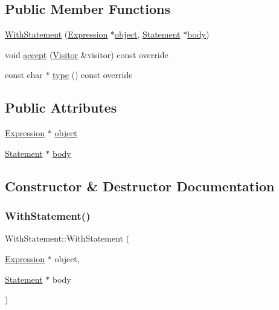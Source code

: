 \subsection*{Public Member Functions}
\begin{DoxyCompactItemize}
\item 
\hyperlink{struct_with_statement_a30feda3f34febbab2584ea274fcd507d}{With\+Statement} (\hyperlink{struct_expression}{Expression} $\ast$\hyperlink{struct_with_statement_a1563aab5799cbe5112e7a0429f4956bd}{object}, \hyperlink{struct_statement}{Statement} $\ast$\hyperlink{struct_with_statement_af7976ff82c99c995f603c2d32e8122ff}{body})
\item 
void \hyperlink{struct_with_statement_a07d3015de8ea5d3f27a0bab8719665f3}{accept} (\hyperlink{struct_visitor}{Visitor} \&visitor) const override
\item 
const char $\ast$ \hyperlink{struct_with_statement_ae26ccb907f2cbc302011c77c7b356ad1}{type} () const override
\end{DoxyCompactItemize}
\subsection*{Public Attributes}
\begin{DoxyCompactItemize}
\item 
\hyperlink{struct_expression}{Expression} $\ast$ \hyperlink{struct_with_statement_a1563aab5799cbe5112e7a0429f4956bd}{object}
\item 
\hyperlink{struct_statement}{Statement} $\ast$ \hyperlink{struct_with_statement_af7976ff82c99c995f603c2d32e8122ff}{body}
\end{DoxyCompactItemize}


\subsection{Constructor \& Destructor Documentation}
\mbox{\label{struct_with_statement_a30feda3f34febbab2584ea274fcd507d}} 
\subsubsection{\texorpdfstring{With\+Statement()}{WithStatement()}}
{\footnotesize\ttfamily With\+Statement\+::\+With\+Statement (\begin{DoxyParamCaption}\item[{\hyperlink{struct_expression}{Expression} $\ast$}]{object,  }\item[{\hyperlink{struct_statement}{Statement} $\ast$}]{body }\end{DoxyParamCaption})\hspace{0.3cm}{\ttfamily [inline]}}



